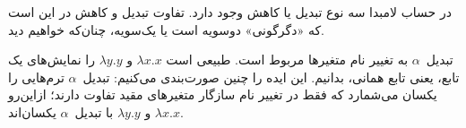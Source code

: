 \documentclass[../../../include/open-logic-section]{subfiles}
\begin{document}

در حساب لامبدا سه نوع تبدیل یا کاهش وجود دارد. تفاوت تبدیل و کاهش در
این است که «دگرگونی» دوسویه است یا یک‌سویه، چنان‌که خواهیم دید.

تبدیل~$\alpha$ به تغییر نام متغیرها مربوط است. طبیعی است
$\lambda x. x$ و $\lambda y.y$ را نمایش‌های یک تابع، یعنی تابع همانی،
بدانیم. این ایده را چنین صورت‌بندی می‌کنیم: تبدیل~$\alpha$ ترم‌هایی را
یکسان می‌شمارد که فقط در تغییر نام سازگار متغیرهای مقید تفاوت دارند؛
ازاین‌رو $\lambda x.x$ و $\lambda y.y$ با تبدیل~$\alpha$ یکسان‌اند.
\end{document}
